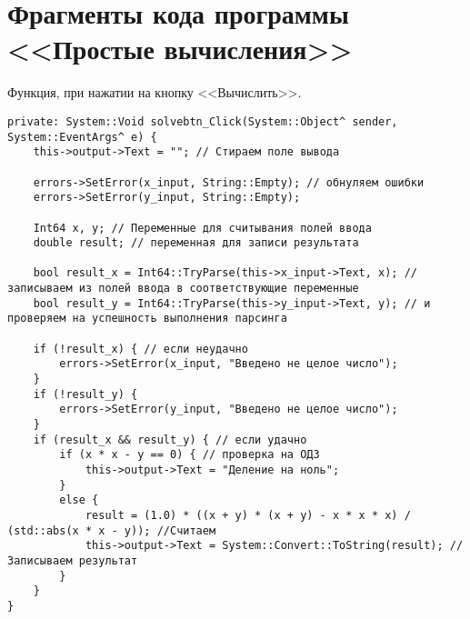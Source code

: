 \section{Фрагменты кода программы <<Простые вычисления>>}
\label{app:simple_calculations}

Функция, при нажатии на кнопку <<Вычислить>>.
\begin{verbatim}
private: System::Void solvebtn_Click(System::Object^ sender, System::EventArgs^ e) {
	this->output->Text = ""; // Стираем поле вывода

	errors->SetError(x_input, String::Empty); // обнуляем ошибки
	errors->SetError(y_input, String::Empty);

	Int64 x, y; // Переменные для считывания полей ввода
	double result; // переменная для записи результата

	bool result_x = Int64::TryParse(this->x_input->Text, x); // записываем из полей ввода в соответствующие переменные
	bool result_y = Int64::TryParse(this->y_input->Text, y); // и проверяем на успешность выполнения парсинга

	if (!result_x) { // если неудачно
		errors->SetError(x_input, "Введено не целое число");
	}
	if (!result_y) {
		errors->SetError(y_input, "Введено не целое число");
	}
	if (result_x && result_y) { // если удачно
		if (x * x - y == 0) { // проверка на ОДЗ
			this->output->Text = "Деление на ноль";
		}
		else {
			result = (1.0) * ((x + y) * (x + y) - x * x * x) / (std::abs(x * x - y)); //Считаем
			this->output->Text = System::Convert::ToString(result); //Записываем результат
		}
	}
}
\end{verbatim}
